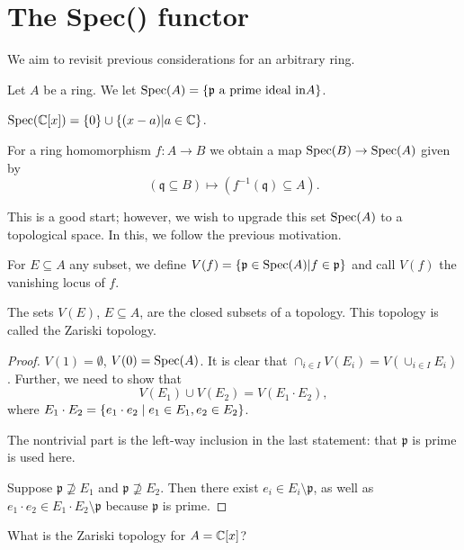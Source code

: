 \section{The Spec() functor}
We aim to revisit previous considerations for an arbitrary ring.

\begin{df}
Let $A$ be a ring.
We let $\text{Spec}(A) = \{ \mathfrak p \text{ a prime ideal in} A \}$.
\end{df}

\begin{example}
  $\text{Spec}(\mathbb C [x]) =  \{0\} \cup \{ (x-a) | a \in \mathbb C \}$.
\end{example}

For a ring homomorphism $f \colon A \to B$ we obtain a map
$\text{Spec}(B) \to \text{Spec}(A)$ given by 
\[(\mathfrak q \subseteq B) \mapsto (f^{-1}(\mathfrak q) \subseteq A).\]

This is a good start; however, we wish to upgrade this set $\text{Spec}(A)$ to a topological space. In this, we follow the previous motivation.

\begin{df}
For $E \subseteq A$ any subset, we define
$V(f) = \{ \mathfrak p \in \text{Spec}(A) | f \in \mathfrak p \}$
and call $V(f)$ the vanishing locus of $f$.
\end{df}

\begin{prop}
  The sets $V(E)$, $E \subseteq A$, are the closed subsets of a topology. This topology is called the Zariski topology.
\end{prop}

\begin{proof}
  $V(1) = \emptyset$, $V(0) = \text{Spec}(A)$.
  It is clear that
  $\cap_{i \in I} V(E_i) = V(\cup_{i \in I} E_i)$.
  Further, we need to show that
\[ V(E_1) \cup V(E_2) = V(E_1 \cdot E_2), \]
where $E_1 \cdot E_2 = \{ e_1 \cdot e_2 \mathrel{|} e_1 \in E_1, e_2 \in E_2 \}$.

The nontrivial part is the left-way inclusion in the last statement: that $\mathfrak p$ is prime is used here.

Suppose $\mathfrak p \not\supseteq E_1$ and $\mathfrak p \not\supseteq E_2$. Then there exist $e_i \in E_i \setminus \mathfrak p$, as well as $e_1 \cdot e_2 \in E_1 \cdot E_2 \setminus \mathfrak p$ because $\mathfrak p$ is prime.
\end{proof}

\begin{question}
What is the Zariski topology for $A = \mathbb C [x]$?
\end{question}

